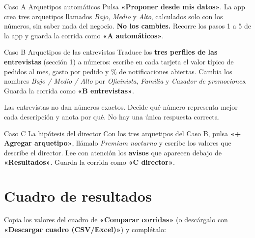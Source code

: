 \documentclass[11pt,letterpaper]{article}
\newcommand{\app}[1]{\textbf{\color{guindaOsc}«#1»}}
\begin{document}
\begin{caso}{Caso A \textperiodcentered{} Arquetipos autom\'aticos}
Pulsa \app{Proponer desde mis datos}. La app crea tres arquetipos llamados \emph{Bajo}, \emph{Medio} y \emph{Alto}, calculados solo con los n\'umeros, sin saber nada del negocio. \textbf{No los cambies.} Recorre los pasos 1 a 5 de la app y guarda la corrida como \app{A autom\'aticos}.
\end{caso}

\begin{caso}{Caso B \textperiodcentered{} Arquetipos de las entrevistas}
Traduce los \textbf{tres perfiles de las entrevistas} (secci\'on 1) a n\'umeros: escribe en cada tarjeta el valor t\'ipico de pedidos al mes, gasto por pedido y \% de notificaciones abiertas. Cambia los nombres \emph{Bajo / Medio / Alto} por \emph{Oficinista}, \emph{Familia} y \emph{Cazador de promociones}. Guarda la corrida como \app{B entrevistas}.

\smallskip
\begin{nota}
Las entrevistas no dan n\'umeros exactos. Decide qu\'e n\'umero representa mejor cada descripci\'on y anota por qu\'e. No hay una \'unica respuesta correcta.
\end{nota}
\end{caso}

\begin{caso}{Caso C \textperiodcentered{} La hip\'otesis del director}
Con los tres arquetipos del Caso B, pulsa \app{+ Agregar arquetipo}, ll\'amalo \emph{Premium nocturno} y escribe los valores que describe el director. Lee con atenci\'on los \textbf{avisos} que aparecen debajo de \app{Resultados}. Guarda la corrida como \app{C director}.
\end{caso}

\section{Cuadro de resultados}
Copia los valores del cuadro de \app{Comparar corridas} (o desc\'argalo con \app{Descargar cuadro (CSV/Excel)}) y compl\'etalo:
\end{document}
